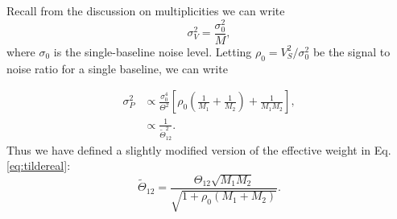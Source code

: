 \documentclass[twocolumn,apj,numberedappendix]{emulateapj}
\renewcommand\[{\begin{equation}}
\renewcommand\]{\end{equation}}
\begin{document}
Recall from the discussion on multiplicities we can write
\begin{equation}
\sigma_V^2=\frac{\sigma_0^2}{M},
\end{equation}
where $\sigma_0$ is the single-baseline noise level. Letting $\rho_0=V_S^2/\sigma_0^2$ be the signal to noise ratio for a single baseline, we can write

\begin{equation}
\begin{aligned}
\sigma_P^2 & \propto  \frac{\sigma_0^4}{\Theta^2} \left[ \rho_0 \left(\frac{1}{M_1}+\frac{1}{M_2} \right) + \frac{1}{M_1 M_2}\right], \\
&\propto \frac{1}{\widetilde{\Theta}_{12}^2}.
\end{aligned}
\end{equation}
Thus we have defined a slightly modified version of the effective weight in Eq.  \eqref{eq:tildereal}:
\begin{equation}
\widetilde{\Theta}_{12}=\frac{\Theta_{12}\sqrt{M_1M_{2}}}{\sqrt{1 + \rho_0 \left(M_1+M_{2} \right)}}.
\end{equation}







\end{document}
